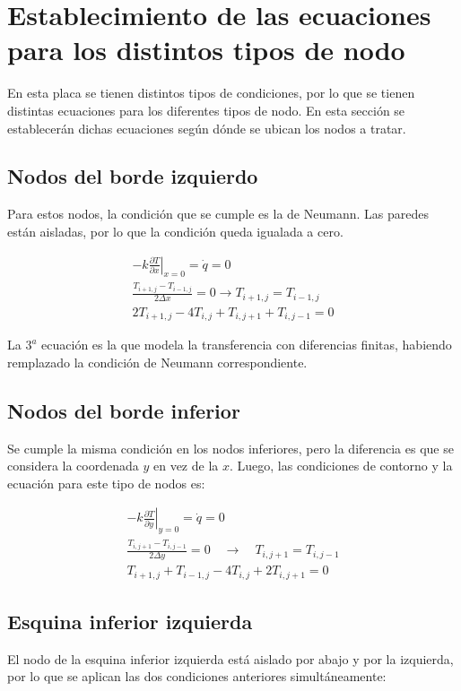 \documentclass[12pt, notitlepage]{article}
\begin{document}
\section{Establecimiento de las ecuaciones para los distintos tipos de nodo}
En esta placa se tienen distintos tipos de condiciones, por lo que se tienen distintas ecuaciones para los diferentes tipos de nodo. En esta sección se establecerán dichas ecuaciones según dónde se ubican los nodos a tratar.

\subsection{Nodos del borde izquierdo}
Para estos nodos, la condición que se cumple es la de Neumann. Las paredes están aisladas, por lo que la condición queda igualada a cero.

\begin{gather*}
-k\left.\frac{\partial T}{\partial x}\right|_{x = 0} = \dot{q} = 0 \\
\frac{T_{i+1,j} - T_{i-1,j}}{2\Delta x} = 0 \rightarrow T_{i+1,j} = T_{i-1,j}\\
2T_{i+1,j} - 4T_{i,j} + T_{i,j+1} + T_{i,j-1} = 0
\end{gather*}

La $3^a$ ecuación es la que modela la transferencia con diferencias finitas, habiendo remplazado la condición de Neumann correspondiente.

\subsection{Nodos del borde inferior}
Se cumple la misma condición en los nodos inferiores, pero la diferencia es que se considera la coordenada $y$ en vez de la $x$. Luego, las condiciones de contorno y la ecuación para este tipo de nodos es:

\begin{gather*}
-k\left.\frac{\partial T}{\partial y}\right|_{y = 0} = \dot{q} = 0 \\
\frac{T_{i,j+1} - T_{i,j-1}}{2\Delta y} = 0 \quad \longrightarrow\quad T_{i,j+1} = T_{i,j-1}\\
T_{i+1,j} + T_{i-1,j} - 4T_{i,j} + 2T_{i,j+1} = 0
\end{gather*}

\subsection{Esquina inferior izquierda}
El nodo de la esquina inferior izquierda está aislado por abajo y por la izquierda, por lo que se aplican las dos condiciones anteriores simultáneamente:
\end{document}
